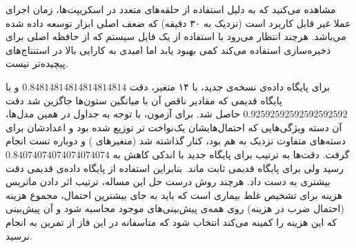 \documentclass[11.5pt,a4paper]{article}
\begin{document}
مشاهده می‌کنید که به دلیل استفاده از حلقه‌های متعدد در اسکریپت‌ها، زمان اجرای  عملا غیر قابل کاربرد است (نزدیک به ۳۰ دقیقه) که ضعف اصلی ابزار توسعه داده شده می‌باشد. هرچند انتظار می‌رود با استفاده از یک فایل سیستم  که از حافظه اصلی  برای ذخیره‌سازی استفاده می‌کند کمی بهبود یابد اما امیدی به کارایی بالا در استنتاج‌های پیچیده‌تر نیست. 

برای پایگاه داده‌ی نسخه‌ی جدید، با ۱۴ متغیر، دقت
$0.84814814814814814814$
و با پایگاه قدیمی که مقادیر ناقص آن با میانگین ستون‌ها جاگزین شد دقت 
$0.92592592592592592592$
حاصل شد. برای آزمون، با توجه به جداول  در همین مدل‌ها، آن دسته ویژگی‌هایی که احتمال‌هایشان یک‌نواخت تر توزیع شده بود و اعدادشان برای دسته‌های متفاوت نزدیک به هم بود، کنار گذاشته شد (متغیرهای 
)
و دوباره تست انجام گرفت. دقت‌ها به ترتیب برای پایگاه جدید با اندکی کاهش به 
$0.84074074074074074074$
رسید ولی برای پایگاه قدیمی ثابت ماند. بنابراین استفاده از پایگاه داده‌ی قدیمی دقت بیشتری به دست داد. هرچند روش درست حل این مساله، ترتیب اثر دادن ماتریس هزینه برای تشخیص غلط بیماری است که باید به جای بیشترین احتمال، مجموع هزینه (احتمال ضرب در هزینه) روی همه‌ی پیش‌بینی‌های موجود محاسبه شود و آن پیش‌بینی که این هزینه را کمینه می‌کند انتخاب شود که متاسفانه در این فاز از تمرین به انجام نرسید. 
\end{document}
